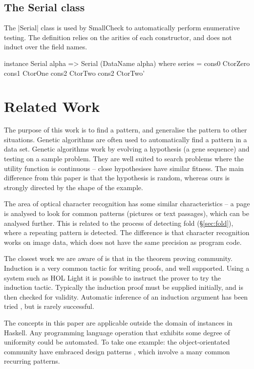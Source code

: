 \documentclass{llncs}
\begin{document}
\subsection{The Serial class}

The |Serial| class is used by SmallCheck \cite{smallcheck} to automatically perform enumerative testing. The definition relies on the arities of each constructor, and does not induct over the field names.

\begin{code}
instance Serial alpha => Serial (DataName alpha) where
    series = cons0 CtorZero \/ cons1 CtorOne  \/ cons2 CtorTwo  \/ cons2 CtorTwo'
\end{code}

\section{Related Work}
\label{sec:related}

The purpose of this work is to find a pattern, and generalise the pattern to other situations. Genetic algorithms \cite{genetic_algorithms} are often used to automatically find a pattern in a data set. Genetic algorithms work by evolving a hypothesis (a gene sequence) and testing on a sample problem. They are well suited to search problems where the utility function is continuous -- close hypothesises have similar fitness. The main difference from this paper is that the hypothesis is random, whereas ours is strongly directed by the shape of the example.

The area of optical character recognition \cite{ocr} has some similar characteristics -- a page is analysed to look for common patterns (pictures or text passages), which can be analysed further. This is related to the process of detecting fold (\S\ref{sec:fold}), where a repeating pattern is detected. The difference is that character recognition works on image data, which does not have the same precision as program code.

The closest work we are aware of is that in the theorem proving community. Induction is a very common tactic for writing proofs, and well supported. Using a system such as HOL Light \cite{hol_light} it is possible to instruct the prover to try the induction tactic. Typically the induction proof must be supplied initially, and is then checked for validity. Automatic inference of an induction argument has been tried \cite{mintchev:reasoning}, but is rarely successful.

The concepts in this paper are applicable outside the domain of instances in Haskell. Any programming language operation that exhibits some degree of uniformity could be automated. To take one example: the object-orientated community have embraced design patterns \cite{design_patterns}, which involve a many common recurring patterns.
\end{document}
